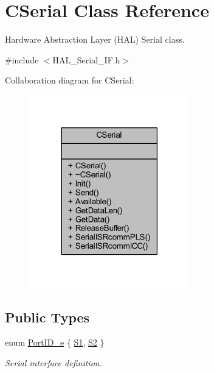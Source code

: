\hypertarget{class_c_serial}{}\section{C\+Serial Class Reference}
\label{class_c_serial}


Hardware Abstraction Layer (H\+AL) Serial class.  




{\ttfamily \#include $<$H\+A\+L\+\_\+\+Serial\+\_\+\+I\+F.\+h$>$}



Collaboration diagram for C\+Serial\+:
\nopagebreak
\begin{figure}[H]
\begin{center}
\leavevmode
\includegraphics[width=198pt]{class_c_serial__coll__graph}
\end{center}
\end{figure}
\subsection*{Public Types}
\begin{DoxyCompactItemize}
\item 
enum \mbox{\hyperlink{class_c_serial_a000039540cc90b18bafacf5744e7eda2}{Port\+I\+D\+\_\+e}} \{ \mbox{\hyperlink{class_c_serial_a000039540cc90b18bafacf5744e7eda2a2a245d3c55e5b6e7052daf261924ce08}{S1}}, 
\mbox{\hyperlink{class_c_serial_a000039540cc90b18bafacf5744e7eda2a8cc95f4591147b0df028e003f82220a1}{S2}}
 \}
\begin{DoxyCompactList}\small\item\em Serial interface definition. \end{DoxyCompactList}\end{DoxyCompactItemize}
